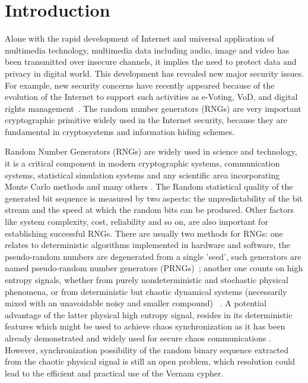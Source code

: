\chapter{Introduction}
\label{Introduction}
\minitoc
Alone with the rapid development of Internet and universal application of multimedia technology, 
multimedia data including audio, image and video has been transmitted over insecure channels, it 
implies the need to protect data and privacy in digital world. This development has revealed new major security issues. 
For example, new security concerns have recently appeared because of the evolution of the Internet to support 
such activities as e-Voting, VoD, and digital rights management~\cite{Zhu200675}. The random number generators 
(RNGs) are very important cryptographic primitive widely used in the Internet security, because they are fundamental 
in cryptosystems and information hiding schemes. 

Random Number Generators (RNGs) are widely used in science and
technology, it is a critical component in modern cryptographic
systems, communication systems, statistical simulation systems and any
scientific area incorporating Monte Carlo methods and many others
\cite{quantum,communication,cryptography}.
The Random statistical
quality of the generated bit sequence is measured by two aspects: the
unpredictability of the bit stream and the speed at which the random
bits can be produced.  Other factors like system complexity, cost,
reliability and so on, are also important for establishing successful
RNGs.
There are usually two methods for RNGs: one relates to
deterministic algorithms implemented in hardware and software, the
pseudo-random numbers are degenerated from a single 'seed', such
generators are named pseudo-random number generators (PRNGs)~\cite{LEcuyer08}; 
another one counts on high entropy signals, whether from purely
nondeterministic and stochastic physical phenomena, or from
deterministic but chaotic dynamical systems (necessarily mixed with an
unavoidable noisy and smaller compound) ~\cite{fast,dice}. A potential
advantage of the latter physical high entropy signal, resides in its
deterministic features which might be used to achieve chaos
synchronization as it has been already demonstrated
\cite{pecora:prl90} and widely used for secure chaos communications
\cite{argyris:nat05}. However, synchronization possibility of the
random binary sequence extracted from the chaotic physical signal is
still an open problem, which resolution could lead to the efficient
and practical use of the Vernam cypher.

